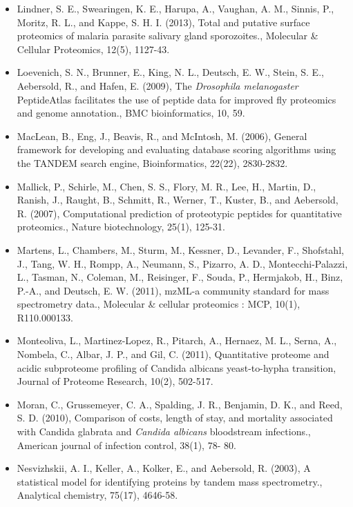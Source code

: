 \begin{itemize}
\item[]{
Lindner, S. E., Swearingen, K. E., Harupa, A., Vaughan, A. M., Sinnis, P., Moritz, R. L., and
Kappe, S. H. I. (2013), Total and putative surface proteomics of malaria parasite salivary
gland sporozoites., Molecular \& Cellular Proteomics, 12(5), 1127-43.
}

\item[]{
Loevenich, S. N., Brunner, E., King, N. L., Deutsch, E. W., Stein, S. E., Aebersold, R., and
Hafen, E. (2009), The \textit{Drosophila melanogaster} PeptideAtlas facilitates the use of peptide
data for improved fly proteomics and genome annotation., BMC bioinformatics, 10, 59.
}

\item[]{
MacLean, B., Eng, J., Beavis, R., and McIntosh, M. (2006), General framework for developing
and evaluating database scoring algorithms using the TANDEM search engine, 
Bioinformatics, 22(22), 2830-2832.
}

\item[]{
Mallick, P., Schirle, M., Chen, S. S., Flory, M. R., Lee, H., Martin, D., Ranish, J., Raught, B.,
Schmitt, R., Werner, T., Kuster, B., and Aebersold, R. (2007), Computational prediction of
proteotypic peptides for quantitative proteomics., Nature biotechnology, 25(1), 125-31.
}

\item[]{
Martens, L., Chambers, M., Sturm, M., Kessner, D., Levander, F., Shofstahl, J., Tang, W. H.,
Rompp, A., Neumann, S., Pizarro, A. D., Montecchi-Palazzi, L., Tasman, N., Coleman, M.,
Reisinger, F., Souda, P., Hermjakob, H., Binz, P.-A., and Deutsch, E. W. (2011), mzML-a
community standard for mass spectrometry data., Molecular \& cellular proteomics : MCP,
10(1), R110.000133.
}

\item[]{
Monteoliva, L., Martinez-Lopez, R., Pitarch, A., Hernaez, M. L., Serna, A., Nombela, C., Albar,
J. P., and Gil, C. (2011), Quantitative proteome and acidic subproteome profiling of Candida
albicans yeast-to-hypha transition, Journal of Proteome Research, 10(2), 502-517.
}

\item[]{
Moran, C., Grussemeyer, C. A., Spalding, J. R., Benjamin, D. K., and Reed, S. D. (2010),
Comparison of costs, length of stay, and mortality associated with Candida glabrata and
\textit{Candida albicans} bloodstream infections., American journal of infection control, 38(1), 78-
80.
}

\item[]{
Nesvizhskii, A. I., Keller, A., Kolker, E., and Aebersold, R. (2003), A statistical model for 
identifying proteins by tandem mass spectrometry., Analytical chemistry, 75(17), 4646-58.
}


\end{itemize}
